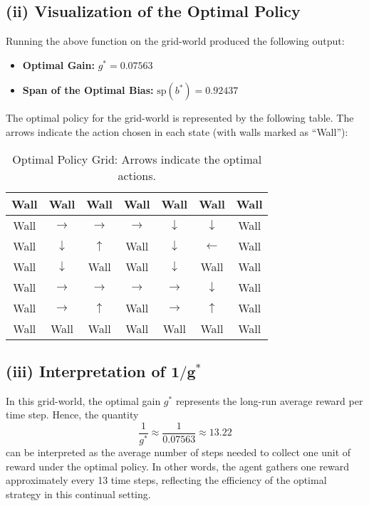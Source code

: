 \subsection*{(ii) Visualization of the Optimal Policy}

Running the above function on the grid-world produced the following output:
\begin{itemize}[noitemsep]
    \item \textbf{Optimal Gain:} $g^* = 0.07563$
    \item \textbf{Span of the Optimal Bias:} $\text{sp}(b^*) = 0.92437$
\end{itemize}

The optimal policy for the grid-world is represented by the following table. The arrows indicate the action chosen in each state (with walls marked as ``Wall''):

\begin{table}[H]
\centering
\begin{tabular}{|c|c|c|c|c|c|c|}
\hline
Wall & Wall & Wall & Wall & Wall & Wall & Wall \\ \hline
Wall & $\rightarrow$ & $\rightarrow$ & $\rightarrow$ & $\downarrow$ & $\downarrow$ & Wall \\ \hline
Wall & $\downarrow$ & $\uparrow$   & Wall      & $\downarrow$ & $\leftarrow$ & Wall \\ \hline
Wall & $\downarrow$ & Wall      & Wall      & $\downarrow$ & Wall      & Wall \\ \hline
Wall & $\rightarrow$ & $\rightarrow$ & $\rightarrow$ & $\rightarrow$ & $\downarrow$ & Wall \\ \hline
Wall & $\rightarrow$ & $\uparrow$   & Wall      & $\rightarrow$ & $\uparrow$   & Wall \\ \hline
Wall & Wall & Wall & Wall & Wall & Wall & Wall \\ \hline
\end{tabular}
\caption{Optimal Policy Grid: Arrows indicate the optimal actions.}
\label{tab:policy}
\end{table}

\subsection*{(iii) Interpretation of $\boldsymbol{1/g^*}$}

In this grid-world, the optimal gain $g^*$ represents the long-run average reward per time step. Hence, the quantity
\[
\frac{1}{g^*} \approx \frac{1}{0.07563} \approx 13.22
\]
can be interpreted as the average number of steps needed to collect one unit of reward under the optimal policy. In other words, the agent gathers one reward approximately every 13 time steps, reflecting the efficiency of the optimal strategy in this continual setting.
